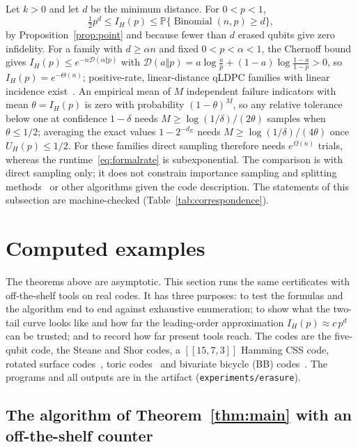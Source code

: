 \documentclass[11pt]{article}
\theoremstyle{remark}
\newcommand{\Prob}{\mathbb P}
\begin{document}
Let \(k>0\) and let \(d\) be the minimum distance. For \(0<p<1\),
\begin{equation}\label{eq:tail}
 \tfrac12p^d\le I_H(p)\le
  \Prob\{\operatorname{Binomial}(n,p)\ge d\},
\end{equation}
by Proposition~\ref{prop:point} and because fewer than \(d\) erased
qubits give zero infidelity. For a family with \(d\ge\alpha n\) and fixed
\(0<p<\alpha<1\), the Chernoff bound gives
\(I_H(p)\le e^{-n\mathcal D(\alpha\Vert p)}\) with
\(\mathcal D(a\Vert p)=a\log\frac ap+(1-a)\log\frac{1-a}{1-p}>0\), so
\(I_H(p)=e^{-\Theta(n)}\); positive-rate, linear-distance qLDPC families
with linear incidence exist~\cite[Theorem 2]{panteleevkalachev2022}.
An empirical mean of \(M\) independent failure indicators with mean
\(\theta=I_H(p)\) is zero with probability \((1-\theta)^M\), so any
relative tolerance below one at confidence \(1-\delta\) needs
\(M\ge\log(1/\delta)/(2\theta)\) samples when \(\theta\le1/2\); averaging
the exact values \(1-2^{-d_E}\) needs \(M\ge\log(1/\delta)/(4\theta)\)
once \(U_H(p)\le1/2\). For these families direct sampling therefore
needs \(e^{\Omega(n)}\) trials, whereas the
runtime~\eqref{eq:formalrate} is subexponential. The comparison is with
direct sampling only; it does not constrain importance sampling and
splitting
methods~\cite{bravyivargo2013,beverland2025,colmenarez2025} or other
algorithms given the code description. The statements of this
subsection are machine-checked (Table~\ref{tab:correspondence}).

\section{Computed examples}
\label{sec:computed}

The theorems above are asymptotic. This section runs the same certificates with off-the-shelf
tools on real codes. It has three purposes: to test the formulas and the
algorithm end to end against exhaustive enumeration; to show what the
two-tail curve looks like and how far the leading-order approximation
\(I_H(p)\approx c\,p^d\) can be trusted; and to record how far
present tools reach. The codes are the five-qubit code, the Steane and
Shor codes, a \([[15,7,3]]\) Hamming CSS code, rotated surface
codes~\cite{bombin2007}, toric codes~\cite{kitaev2003} and bivariate
bicycle (BB) codes~\cite{bravyi2024bb}. The programs and all outputs are
in the artifact (\texttt{experiments/erasure}).

\subsection{The algorithm of Theorem~\ref{thm:main} with an off-the-shelf counter}
\label{sec:computed-paper}
\end{document}
